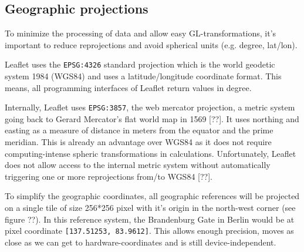     \subsection{Geographic projections}
      To minimize the processing of data and allow easy GL-transformations, it's important to reduce reprojections and avoid spherical units (e.g. degree, lat/lon).\par
      Leaflet uses the \texttt{EPSG:4326} standard projection which is the world geodetic system 1984 (WGS84) and uses a latitude/longitude coordinate format. This means, all programming interfaces of Leaflet return values in degree.\par
      Internally, Leaflet uses \texttt{EPSG:3857}, the web mercator projection, a metric system going back to Gerard Mercator's flat world map in 1569 [??]. It uses northing and easting as a measure of distance in meters from the equator and the prime meridian. This is already an advantage over WGS84 as it does not require computing-intense spheric transformations in calculations. Unfortunately, Leaflet does not allow access to the internal metric system without automatically triggering one or more reprojections from/to WGS84 [??].\par


      To simplify the geographic coordinates, all geographic references will be projected on a single tile of size 256*256 pixel with it's origin in the north-west corner (see figure ??). In this reference system, the Brandenburg Gate in Berlin would be at pixel coordinate \texttt{[137.51253, 83.9612]}. This allows enough precision, moves as close as we can get to hardware-coordinates and is still device-independent.\par

